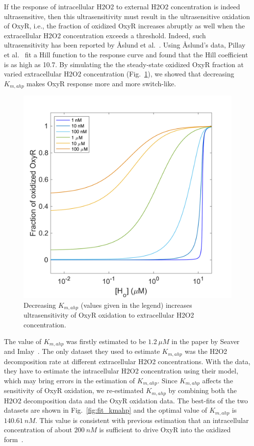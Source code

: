 \documentclass[10pt]{article}
\begin{document}
If the response of intracellular H2O2 to external H2O2 concentration is indeed ultrasensitive, then this ultrasensitivity must result in the ultrasensitive oxidation of OxyR, i.e., the fraction of oxidized OxyR increases abruptly as well when the extracellular H2O2 concentration exceeds a threshold. Indeed, such ultrasensitivity has been reported by Åslund et al.~\cite{aaslund1999regulation}. Using Åslund's data, Pillay et al.~\cite{pillay2016quantitative} fit a Hill function to the response curve and found that the Hill coefficient is as high as 10.7. By simulating the the steady-state oxidized OxyR fraction at varied extracellular H2O2 concentration (Fig.~\ref{fig:decrease_kmahp}), we showed that decreasing $K_{m,ahp}$ makes OxyR response more and more switch-like.

\begin{figure}[H]
\centering
  \includegraphics[width=0.5\linewidth]{ultrasensitivity_oxyr_decrease_Kmahp.png}
  \caption{Decreasing $K_{m,ahp}$ (values given in the legend) increases ultrasensitivity of OxyR oxidation to extracellular H2O2 concentration.}
  \label{fig:decrease_kmahp}
\end{figure}

The value of $K_{m,ahp}$ was firstly estimated to be $1.2~\mu M$ in the paper by Seaver and Imlay~\cite{seaver2001hydrogen}. The only dataset they used to estimate $K_{m,ahp}$ was the H2O2 decomposition rate at different extracellular H2O2 concentrations. With the data, they have to estimate the intracellular H2O2 concentration using their model, which may bring errors in the estimation of $K_{m,ahp}$. Since $K_{m,ahp}$ affects the sensitivity of OxyR oxidation, we re-estimated $K_{m,ahp}$ by combining both the H2O2 decomposition data and the OxyR oxidation data. The best-fits of the two datasets are shown in Fig.~\ref{fig:fit_kmahp} and the optimal value of $K_{m,ahp}$ is $140.61~nM$. This value is consistent with previous estimation that an intracellular concentration of about $200~nM$ is sufficient to drive OxyR into the oxidized form~\cite{imlay2013molecular}.
\end{document}
